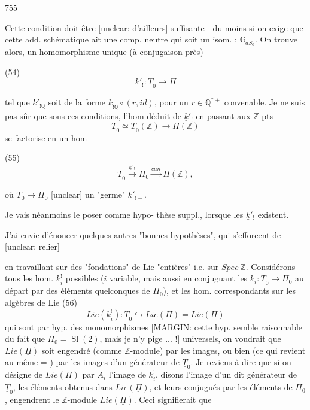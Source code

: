 \newpage


755

Cette condition doit être [unclear: d'ailleurs] suffisante - du
moins si on exige que cette add. schématique
ait une comp. neutre qui soit un isom. : $\mathbb{G}_{a S_0}$.
On trouve alors, un homomorphisme
unique (à conjugaison près)

(54) $$ \underline{k}'_! : \underline{T}_0 \longrightarrow \underline{\Pi} $$

tel que $\underline{k}'_{! \mathbb{Q}}$ soit de la forme $\underline{k}_{! \mathbb{Q}} \circ (r, id)$,
pour un $r \in \mathbb{Q}^{*+}$ convenable. Je ne suis
pas sûr que sous ces conditions, l'hom déduit de $\underline{k}'_!$ en
passant aux $\mathbb{Z}$-pts
$$ \underline{T}_0 \simeq \underline{T}_0(\mathbb{Z}) \longrightarrow \underline{\Pi}(\mathbb{Z}) $$
se factorise en un hom

(55) $$ \underline{T}_0 \xrightarrow{\underline{k}'_!} \Pi_0 \xrightarrow{can} \underline{\Pi}(\mathbb{Z}) , $$

où $T_0 \to \Pi_0$ [unclear] un "germe" $\underline{k}'_{!-}$.

Je vais néanmoins le poser comme hypo-
thèse suppl., lorsque les $\underline{k}'_!$ existent.

J'ai envie d'énoncer quelques autres
"bonnes hypothèses", qui s'efforcent de [unclear: relier]

\newpage


en travaillant sur des "fondations" de
Lie "entières" i.e. sur $Spec \ \mathbb{Z}$.
Considérons tous les hom. $\underline{k}_i^!$ possibles
($i$ variable, mais aussi en conjuguant les
$k_i : \underline{T}_0 \to \Pi_0$ au départ par des éléments
quelconques de $\Pi_0$), et les hom.
correspondants sur les algèbres de Lie
(56) $$Lie(\underline{k}_i^!) : \underline{T}_0 \hookrightarrow \underline{Lie}(\underline{\Pi}) = Lie(\Pi)$$
qui sont par hyp. des monomorphismes
[MARGIN: cette hyp. semble raisonnable du fait que $\Pi_0 = \operatorname{Sl}(2)$, mais je n'y pige ... !]
universels, on voudrait que $Lie(\underline{\Pi})$ soit
engendré (comme $\mathbb{Z}$-module) par
les images, ou bien (ce qui revient au même = ) par
les images d'un générateur de $\underline{T}_0$. Je
reviens à dire que si on désigne de $Lie(\underline{\Pi})$
par $A_i$ l'image de $\underline{k}_i^!$, disons l'image d'un dit
générateur de $\underline{T}_0$, les éléments obtenus
dans $Lie(\underline{\Pi})$, et leurs conjugués
par les éléments de $\Pi_0$, engendrent le
$\mathbb{Z}$-module $Lie(\underline{\Pi})$. Ceci signifierait que

